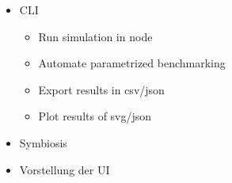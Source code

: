 \begin{itemize}
\begin{itemize}
    \end{itemize}
    \item CLI
    \begin{itemize}
        \item Run simulation in node
        \item Automate parametrized benchmarking
        \item Export results in csv/json
        \item Plot results of svg/json
    \end{itemize}
    \item Symbiosis
        \item Vorstellung der UI
\end{itemize}


\newpage
